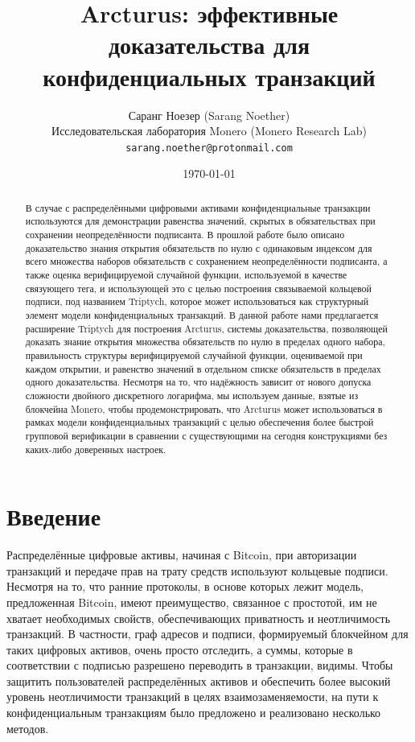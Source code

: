 \documentclass{article}
\title{Arcturus: эффективные доказательства для конфиденциальных транзакций}
\author{Саранг Ноезер (Sarang Noether) \\ Исследовательская лаборатория Monero (Monero Research Lab) \\ \texttt{sarang.noether@protonmail.com}}
\date{\today}
\theoremstyle{definition}
\begin{document}
\maketitle


\begin{abstract}
В случае с распределёнными цифровыми активами конфиденциальные транзакции используются для демонстрации равенства значений, скрытых в обязательствах при сохранении неопределённости подписанта.
В прошлой работе было описано доказательство знания открытия обязательств по нулю с одинаковым индексом для всего множества наборов обязательств с сохранением неопределённости подписанта, а также оценка верифицируемой случайной функции, используемой в качестве связующего тега, и использующей это с целью построения связываемой кольцевой подписи, под названием Triptych, которое может использоваться как структурный элемент модели конфиденциальных транзакций.
В данной работе нами предлагается расширение Triptych для построения Arcturus, системы доказательства, позволяющей доказать знание открытия множества обязательств по нулю в пределах одного набора, правильность структуры верифицируемой случайной функции, оцениваемой при каждом открытии, и равенство значений в отдельном списке обязательств в пределах одного доказательства. Несмотря на то, что надёжность зависит от нового допуска сложности двойного дискретного логарифма, мы используем данные, взятые из блокчейна Monero, чтобы продемонстрировать, что Arcturus может использоваться в рамках модели конфиденциальных транзакций с целью обеспечения более быстрой групповой верификации в сравнении с существующими на сегодня конструкциями без каких-либо доверенных настроек.
\end{abstract}


\section{Введение}
Распределённые цифровые активы, начиная с Bitcoin, при авторизации транзакций и передаче прав на трату средств используют кольцевые подписи.
Несмотря на то, что ранние протоколы, в основе которых лежит модель, предложенная Bitcoin, имеют преимущество, связанное с простотой, им не хватает необходимых свойств, обеспечивающих приватность и неотличимость транзакций. В частности, граф адресов и подписи, формируемый блокчейном для таких цифровых активов, очень просто отследить, а суммы, которые в соответствии с подписью разрешено переводить в транзакции, видимы.
Чтобы защитить пользователей распределённых активов и обеспечить более высокий уровень неотличимости транзакций в целях взаимозаменяемости, на пути к конфиденциальным транзакциям было предложено и реализовано несколько методов.
\end{document}
